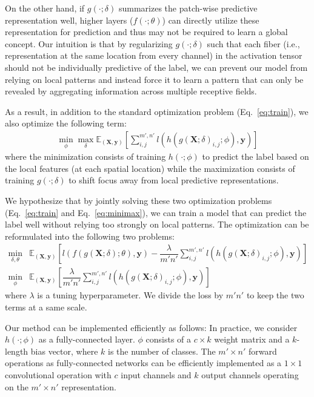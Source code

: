 \documentclass{article}
\begin{document}
On the other hand, if $g(\cdot;\delta)$ summarizes 
the patch-wise predictive representation well, 
higher layers ($f(\cdot;\theta)$) can  
directly utilize these representation for prediction 
and thus may not be required to learn a global concept. 
Our intuition is that by regularizing $g(\cdot;\delta)$ 
such that each fiber 
(i.e., representation at the same location from every channel)
in the activation tensor
should not be individually predictive of the label,
we can prevent our model from relying on local patterns
and instead force it to learn a pattern that can only be revealed
by aggregating information across multiple receptive fields. 


As a result, in addition to the standard optimization problem (Eq.~\ref{eq:train}), 
we also optimize the following term:
\begin{align}
    \min_{\phi}\max_{\delta} \mathbb{E}_{(\mathbf{X}, \mathbf{y})}[\sum_{i,j}^{m',n'}l(h(g(\mathbf{X};\delta)_{i,j};\phi), \mathbf{y})]
    \label{eq:minimax}
\end{align}
where the minimization consists of training $h(\cdot; \phi)$ 
to predict the label based on the local features (at each spatial location)
while the maximization consists of training $g(\cdot;\delta)$ 
to shift focus away from local predictive representations. 


We hypothesize that by jointly solving 
these two optimization problems 
(Eq.~\ref{eq:train} and Eq.~\ref{eq:minimax}), 
we can train a model that can predict the label well 
without relying too strongly on local patterns. 
The optimization can be reformulated 
into the following two problems:
\begin{align*}
    \min_{\delta, \theta} &\mathbb{E}_{(\mathbf{X}, \mathbf{y})}[l(f(g(\mathbf{X};\delta);\theta), \mathbf{y}) -\dfrac{\lambda}{m'n'}\sum_{i,j}^{m',n'} l(h(g(\mathbf{X};\delta)_{i,j};\phi), \mathbf{y})] \\
    \min_{\phi}& \mathbb{E}_{(\mathbf{X}, \mathbf{y})}[\dfrac{\lambda}{m'n'}\sum_{i,j}^{m',n'}l(h(g(\mathbf{X};\delta)_{i,j};\phi), \mathbf{y})]
\end{align*}
where $\lambda$ is a tuning hyperparameter. 
We divide the loss by $m'n'$ to keep the two terms at a same scale. 

Our method can be implemented efficiently as follows: 
In practice, we consider $h(\cdot; \phi)$ as a fully-connected layer. 
$\phi$ consists of a $c \times k$ weight matrix and a $k$-length bias vector, 
where $k$ is the number of classes. 
The $m'\times n'$ forward operations as fully-connected networks
can be efficiently implemented as a $1 \times 1$ convolutional operation 
with $c$ input channels and $k$ output channels operating on the $m'\times n'$ representation. 
\end{document}
